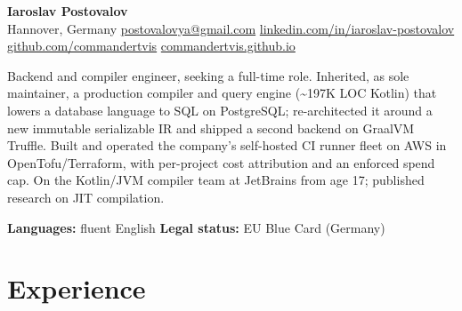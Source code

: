 \documentclass[10pt,a4paper]{article}
\begin{document}
\noindent
{\headerfont\Huge\bfseries\color{accent} Iaroslav Postovalov}\\[0.4em]
{\footnotesize
  Hannover, Germany \;\textbar\; \href{mailto:postovalovya@gmail.com}{postovalovya@gmail.com} \;\textbar\; \href{https://linkedin.com/in/iaroslav-postovalov}{linkedin.com/in/iaroslav-postovalov} \;\textbar\; \href{https://github.com/commandertvis}{github.com/commandertvis} \;\textbar\; \href{https://commandertvis.github.io}{commandertvis.github.io}
}

\vspace{0.3em}

\noindent
Backend and compiler engineer, seeking a full-time role. Inherited, as sole maintainer, a production compiler and query engine (\textasciitilde197K LOC Kotlin) that lowers a database language to SQL on PostgreSQL; re-architected it around a new immutable serializable IR and shipped a second backend on GraalVM Truffle. Built and operated the company's self-hosted CI runner fleet on AWS in OpenTofu/Terraform, with per-project cost attribution and an enforced spend cap. On the Kotlin/JVM compiler team at JetBrains from age 17; published research on JIT compilation.

\vspace{0.3em}
\noindent
\textbf{Languages:} fluent English \quad\textbar\quad \textbf{Legal status:} EU Blue Card (Germany)

\section*{Experience}
\end{document}
